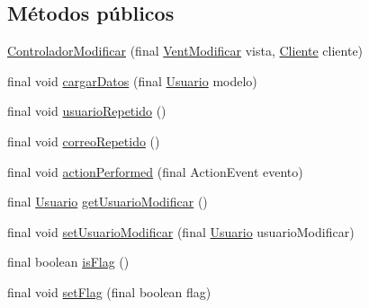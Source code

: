 \subsection*{Métodos públicos}
\begin{DoxyCompactItemize}
\item 
\hyperlink{classcom_1_1ucab_1_1javachat_1_1_cliente_1_1controller_1_1_controlador_modificar_a6123a8b8e53bbf04d1a68ff4722e2dd9}{Controlador\-Modificar} (final \hyperlink{classcom_1_1ucab_1_1javachat_1_1_cliente_1_1view_1_1_vent_modificar}{Vent\-Modificar} vista, \hyperlink{classcom_1_1ucab_1_1javachat_1_1_cliente_1_1model_1_1_cliente}{Cliente} cliente)
\item 
final void \hyperlink{classcom_1_1ucab_1_1javachat_1_1_cliente_1_1controller_1_1_controlador_modificar_a70d237e77c3b71f36bbacf7273ecc928}{cargar\-Datos} (final \hyperlink{classcom_1_1ucab_1_1javachat_1_1_cliente_1_1model_1_1_usuario}{Usuario} modelo)
\item 
final void \hyperlink{classcom_1_1ucab_1_1javachat_1_1_cliente_1_1controller_1_1_controlador_modificar_a98998ef15a60c2652086c638f3d49626}{usuario\-Repetido} ()
\item 
final void \hyperlink{classcom_1_1ucab_1_1javachat_1_1_cliente_1_1controller_1_1_controlador_modificar_a15be7ce5dba7613ab67666421ad5df8b}{correo\-Repetido} ()
\item 
final void \hyperlink{classcom_1_1ucab_1_1javachat_1_1_cliente_1_1controller_1_1_controlador_modificar_adf78b1559924c21769b55b0c3f5d799f}{action\-Performed} (final Action\-Event evento)
\item 
final \hyperlink{classcom_1_1ucab_1_1javachat_1_1_cliente_1_1model_1_1_usuario}{Usuario} \hyperlink{classcom_1_1ucab_1_1javachat_1_1_cliente_1_1controller_1_1_controlador_modificar_a50fed3d5d044639f7a4d8fc076876d88}{get\-Usuario\-Modificar} ()
\item 
final void \hyperlink{classcom_1_1ucab_1_1javachat_1_1_cliente_1_1controller_1_1_controlador_modificar_a567c65f9fbdc43f40e4ab0dd7c047ba9}{set\-Usuario\-Modificar} (final \hyperlink{classcom_1_1ucab_1_1javachat_1_1_cliente_1_1model_1_1_usuario}{Usuario} usuario\-Modificar)
\item 
final boolean \hyperlink{classcom_1_1ucab_1_1javachat_1_1_cliente_1_1controller_1_1_controlador_modificar_a8a658d9065bd5f1e88a2a99f23d50784}{is\-Flag} ()
\item 
final void \hyperlink{classcom_1_1ucab_1_1javachat_1_1_cliente_1_1controller_1_1_controlador_modificar_ade1618d2df8cbec7a97be5c2ee1d3eca}{set\-Flag} (final boolean flag)
\end{DoxyCompactItemize}


